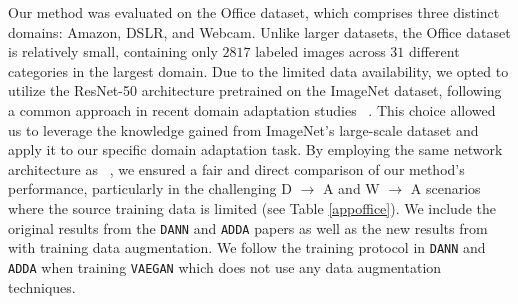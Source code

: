 \documentclass{article}
\begin{document}
Our method was evaluated on the Office dataset, which comprises three distinct domains: Amazon, DSLR, and Webcam. Unlike larger datasets, the Office dataset is relatively small, containing only $2817$ labeled images across $31$ different categories in the largest domain. Due to the limited data availability, we opted to utilize the ResNet-50 architecture pretrained on the ImageNet dataset, following a common approach in recent domain adaptation studies ~\cite{tzeng2017adversarial, chen2020adversarial}. This choice allowed us to leverage the knowledge gained from ImageNet's large-scale dataset and apply it to our specific domain adaptation task. By employing the same network architecture as ~\cite{tzeng2017adversarial}, we ensured a fair and direct comparison of our method's performance, particularly in the challenging D $\rightarrow$ A and W $\rightarrow$ A scenarios where the source training data is limited (see Table \ref{appoffice}). We include the original results from the \verb "DANN" and \verb "ADDA" papers as well as the new results from~\cite{chen2020adversarial} with training data augmentation. We follow the training protocol in \verb "DANN" and \verb "ADDA" when training \verb "VAEGAN" which does not use any data augmentation techniques.
\end{document}
